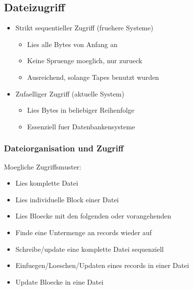 \documentclass[a4paper]{scrreprt}
\begin{document}
\subsection{Dateizugriff}
\begin{itemize}
	\item Strikt sequentieller Zugriff (fruehere Systeme)
		\begin{itemize}
			\item Lies alle Bytes von Anfang an
			\item Keine Spruenge moeglich, nur zurueck
			\item Ausreichend, solange Tapes benutzt wurden
		\end{itemize}
	\item Zufaelliger Zugriff (aktuelle System)
		\begin{itemize}
			\item Lies Bytes in beliebiger Reihenfolge
			\item Essenziell fuer Datenbankensysteme
		\end{itemize}
\end{itemize}

\subsubsection{Dateiorganisation und Zugriff}
Moegliche Zugriffsmuster:
\begin{itemize}
	\item Lies komplette Datei
	\item Lies individuelle Block einer Datei
	\item Lies Bloecke mit den folgenden oder vorangehenden
	\item Finde eine Untermenge an records wieder auf
	\item Schreibe/update eine komplette Datei sequenziell
	\item Einfuegen/Loeschen/Updaten eines records in einer Datei
	\item Update Bloecke in eine Datei
\end{itemize}
\end{document}
